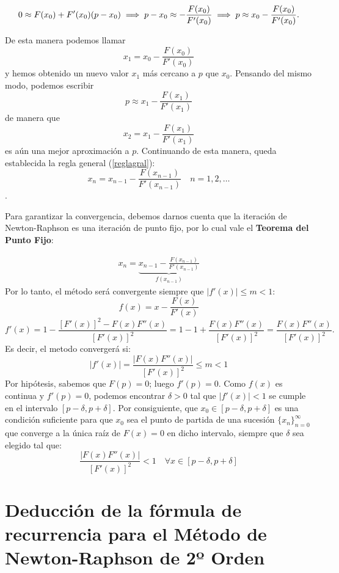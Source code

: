 \documentclass[openany]{book}
\begin{document}
\begin{equation}
0 \approx F(x_0) + F'(x_0)(p-x_0) \implies p-x_0 \approx - \frac{F(x_0)}{F'(x_0)}\\
\implies p \approx x_0 - \frac{F(x_0)}{F'(x_0)}.
\label{eq:relacion}
\end{equation}

De esta manera podemos llamar \[x_1 = x_0 - \frac{F(x_0)}{F'(x_0)}\] y hemos obtenido un nuevo valor \(x_1\) más cercano a \(p\) que \(x_0\). Pensando del mismo modo, podemos escribir \[p \approx x_1 - \frac{F(x_1)}{F'(x_1)}\] de manera que \[x_2 = x_1 - \frac{F(x_1)}{F'(x_1)}\] es aún una mejor aproximación a \(p\). Continuando de esta manera, queda establecida la regla general (\ref{reglagral}): \[x_n = x_{n-1} - \frac{F(x_{n-1})}{F'(x_{n-1})} \quad n=1,2,\dots\].

Para garantizar la convergencia, debemos darnos cuenta que la iteración de Newton-Raphson es una iteración de punto fijo, por lo cual vale el \textbf{Teorema del Punto Fijo}:

\begin{gather*}
x_n = 
\underbrace{x_{n-1} - \frac{F(x_{n-1})}{F'(x_{n-1})}}_{f(x_{n-1})} 
\end{gather*}
Por lo tanto, el método será convergente siempre que \(|f'(x)| \leq m < 1\):
\[f(x) = x - \frac{F(x)}{F'(x)}\]
\[f'(x) = 1 - \frac{[F'(x)]^2 - F(x)F''(x)}{[F'(x)]^2} = 1 - 1 + \frac{F(x)F''(x)}{[F'(x)]^2} = \frac{F(x)F''(x)}{[F'(x)]^2}.\]
Es decir, el metodo convergerá si:
\[|f'(x)| = \frac{|F(x)F''(x)|}{[F'(x)]^2} \leq m < 1\]
Por hipótesis, sabemos que \(F(p) = 0\); luego \(f'(p) = 0\). Como \(f(x)\) es continua y \(f'(p) = 0\), podemos encontrar \(\delta > 0\) tal que \(|f'(x)| < 1\) se cumple en el intervalo \([p - \delta, p + \delta]\). Por consiguiente, que \(x_0 \in [p - \delta, p + \delta]\) es una condición suficiente para que \(x_0\) sea el punto de partida de una sucesión \(\{x_n\}_{n=0}^{\infty}\) que converge a la única raíz de \(F(x) = 0\) en dicho intervalo, siempre que \(\delta\) sea elegido tal que:
\[\frac{|F(x)F''(x)|}{[F'(x)]^2} < 1  \quad \forall x \in [p - \delta, p + \delta]\]

\hypertarget{deducciuxf3n-de-la-fuxf3rmula-de-recurrencia-para-el-muxe9todo-de-newton-raphson-de-2uxba-orden}{%
\section*{Deducción de la fórmula de recurrencia para el Método de Newton-Raphson de 2º Orden}\label{deducciuxf3n-de-la-fuxf3rmula-de-recurrencia-para-el-muxe9todo-de-newton-raphson-de-2uxba-orden}}
\end{document}
